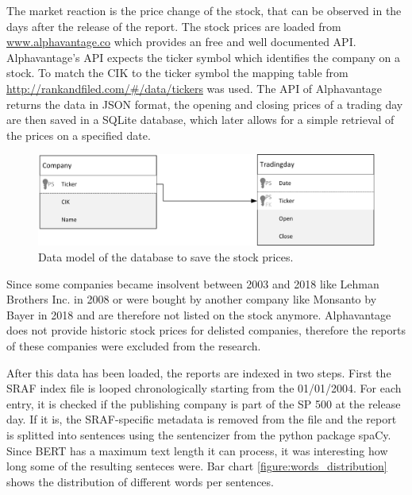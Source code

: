 The market reaction is the price change of the stock, that can be observed in the days after the release of the report.
The stock prices are loaded from \url{www.alphavantage.co} which provides an free and well documented \ac{API}.
Alphavantage's \ac{API} expects the ticker symbol which identifies the company on a stock.
To match the \ac{CIK} to the ticker symbol the mapping table from \url{http://rankandfiled.com/#/data/tickers} was used.
The \ac{API} of Alphavantage returns the data in \ac{JSON} format, the opening and closing prices of a trading day are then saved in a SQLite database, which later allows for a simple retrieval of the prices on a specified date.
\begin{figure}[h]
    \centering
    \includegraphics[width=1\textwidth]{figures/Datenmodell.png}
    \caption{Data model of the database to save the stock prices.}
    \label{figure:data_model}
\end{figure}
Since some companies became insolvent between 2003 and 2018 like Lehman Brothers Inc. in 2008 or were bought by another company like Monsanto by Bayer in 2018 and are therefore not listed on the stock anymore.
Alphavantage does not provide historic stock prices for delisted companies, therefore the reports of these companies were excluded from the research.

After this data has been loaded, the reports are indexed in two steps.
First the \ac{SRAF} index file is looped chronologically starting from the 01/01/2004.
For each entry, it is checked if the publishing company is part of the \ac{SP} 500 at the release day.
If it is, the \ac{SRAF}-specific metadata is removed from the file and the report is splitted into sentences using the sentencizer from the python package spaCy.
Since \acs{BERT} has a maximum text length it can process, it was interesting how long some of the resulting senteces were.
Bar chart \ref{figure:words_distribution} shows the distribution of different words per sentences.


